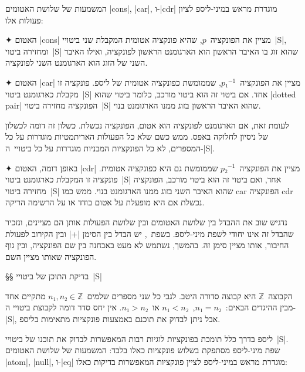 המשמעות של שלושת האטומים \T|cons|, \T|car|, ו-\T|cdr| מוגדרת מראש במיני-ליספ
לציון פעולות אלו:

\begin{enumerate}
  ✦ האטום \T|cons| מציין את הפונקציה~$p$, שהיא פונקציה אטומית המקבלת שני
  ביטויי~\E|S|, ומחזירה ביטוי~\E|S| שהוא זוג בו האיבר הראשון הוא הארגומנט
  הראשון לפונקציה, ואילו האיבר השני של הזוג הוא הארגומנט השני לפונקציה.

  ✦ האטום \T|car| מציין את הפונקציה~$p₁^{-1}$, שממומשת כפונקציה אטומית של
  ליספ. פונקציה זו מקבלת כארגומנט ביטוי~\E|S| אחד. אם ביטוי זה הוא ביטוי מורכב,
  כלומר ביטוי שהוא \E|dotted pair| הפונקציה מחזירה ביטוי~\E|S| שהוא האיבר
  הראשון בזוג ממנו הארגומנט בנוי.

  לעומת זאת, אם הארגומנט לפונקציה הוא אטום, הפונקציה נכשלת. כשלון זה דומה
  לכשלון של ניסיון לחלוקה באפס. ממש כשם שלא כל הפעולות האריתמטיות מוגדרות על כל
  המספרים, לא כל הפונקציות המבניות מוגדרות על כל ביטויי~ה-\E|S|.

  ✦ באופן דומה, האטום \T|cdr| מציין את הפונקציה~$p₂^{-1}$ שממומשת גם היא
  כפונקציה אטומית. פונקציה זו המקבלת כארגומנט ביטוי~\E|S| אחד, ואם ביטוי זה
  הוא ביטוי מורכב, הפונקציה מחזירה ביטוי~\E|S| שהוא האיבר השני בזוג ממנו
  הארגומנט בנוי. ממש כמו car הפונקציה cdr נכשלת אם היא מופעלת על אטום בודד
  או על הרשימה הריקה.
\end{enumerate}

נדגיש שוב את ההבדל בין שלושת האטומים ובין שלושת הפעולות אותן הם מציינים, ונזכיר
שהבדל זה אינו יחודי לשפת מיני-ליספ. בשפת~\CPL, יש הבדל בין הסימן \T|+| ובין
הקירוב לפעולת החיבור, אותו מציין סימן זה. בהמשך, נשתמש לא מעט באבחנה בין שם
הפונקציה, ובין גוף הפונקציה שאותו מציין השם.

§§ בדיקת התוכן של ביטויי~\E|S|

הקבוצה~$ℤ$ היא קבוצה סדורה היטב. לגבי כל שני מספרים שלמים~$n₁,n₂∈ℤ$
מתקיים אחד מבין ההיגדים הבאים:~$n₁=n₂$,~$n₁<n₂$ או~$n₁>n₂$. אין יחס סדר דומה
לקבוצת ביטויי ה-\E|S|, אבל ניתן לבדוק את תוכנם באמצעות פונקציות מתאימות בליספ.

ליספ בדרך כלל תומכת בפונקציות לוגיות רבות המאפשרות לבדוק את תוכנו של
ביטויי~\E|S|. שפת מיני-ליספ מסתפקת בשלוש פונקציות כאלו בלבד: המשמעות של שלושת
האטומים \T|atom|, \T|null|, ו-\T|eq| מוגדרת מראש במיני-ליספ לציין פונקציות
המאפשרות בדיקות כאלו:

